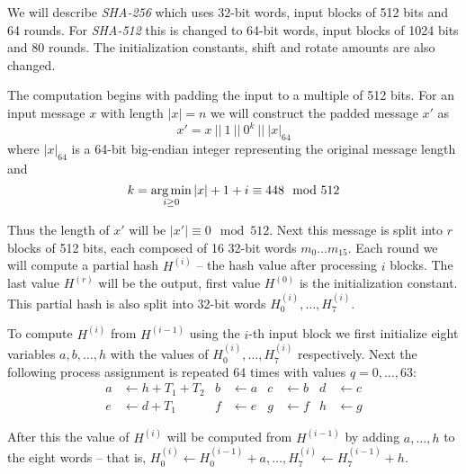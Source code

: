 We will describe \emph{SHA-256} which uses 32-bit words, input blocks of 512 bits and 64 rounds.
For \emph{SHA-512} this is changed to 64-bit words, input blocks of 1024 bits and 80 rounds.
The initialization constants, shift and rotate amounts are also changed.

The computation begins with padding the input to a multiple of 512 bits.
For an input message $x$ with length $|x| = n$ we will construct the padded message $x'$ as
\[
x' = x ~||~ 1 ~||~ 0^k ~||~ |x|_{64}
\]
where $|x|_{64}$ is a 64-bit big-endian integer representing the original message length and
\[
k = \operatorname*{arg\,min}_{i \ge 0} |x| + 1 + i \equiv 448 \mod 512
\]

Thus the length of $x'$ will be $|x'| \equiv 0 \mod 512$.
Next this message is split into $r$ blocks of 512 bits, each composed of 16 32-bit words $m_0 \dots m_{15}$.
Each round we will compute a partial hash $H^{(i)}$ -- the hash value after processing $i$ blocks.
The last value $H^{(r)}$ will be the output, first value $H^{(0)}$ is the initialization constant.
This partial hash is also split into 32-bit words $H^{(i)}_0, \dots, H^{(i)}_7$.

To compute $H^{(i)}$ from $H^{(i-1)}$ using the $i$-th input block we first initialize eight variables $a, b, \dots, h$ with the values of $H^{(i)}_0, \dots, H^{(i)}_7$ respectively.
Next the following process assignment is repeated 64 times with values $q=0, \dots, 63$:
\begin{align*}
a &\gets h + T_1 + T_2  &b &\gets a &c &\gets b &d &\gets c \\
e &\gets d + T_1 &f &\gets e &g &\gets f &h &\gets g
\end{align*}

After this the value of $H^{(i)}$ will be computed from $H^{(i-1)}$ by adding $a, \dots, h$ to the eight words -- that is, $H^{(i)}_0 \gets H^{(i-1)}_0 + a, \dots, H^{(i)}_7 \gets H^{(i-1)}_7 + h$.

